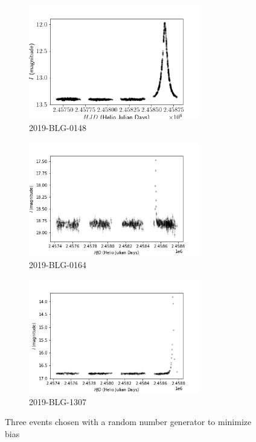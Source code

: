 \documentclass{article}
\begin{document}
    \begin{figure}[h]
        \begin{subfigure}{0.329\textwidth}
            \includegraphics[width=1\linewidth, height=5cm]{Images/2019-BLG-148_Original_Data.png} 
            \caption{2019-BLG-0148}
            \label{fig:Mini-Event-One}
        \end{subfigure}
        \begin{subfigure}{0.329\textwidth}
            \includegraphics[width=1\linewidth, height=5cm]{Images/2019-BLG-0164_Original_Data.png}
            \caption{2019-BLG-0164}
            \label{fig:Mini-Event-Two}
        \end{subfigure}
        \begin{subfigure}{0.329\textwidth}
            \includegraphics[width=1\linewidth, height=5cm]{Images/2019-BLG-1307_Original_Data.png}
            \caption{2019-BLG-1307}
            \label{fig:Mini-Event-Three}
        \end{subfigure}
    \caption{Three events chosen with a random number generator to minimize bias}
    \label{fig:image2}
    \end{figure}
    
\end{document}
